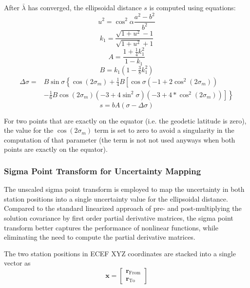 After $\bar{\lambda}$ has converged, the ellipsoidal distance $s$ is computed using equations:
\begin{equation}
u^2 = \cos^2 \alpha \frac{a^2 - b^2}{b^2}
\end{equation}
\begin{equation}
k_1 = \frac{\sqrt{1 + u^2} - 1}{\sqrt{1 + u^2} + 1} 
\end{equation}
\begin{equation}
A = \frac{1 + \tfrac{1}{4} k_1^2}{1-k_1}
\end{equation}
\begin{equation}
 B = k_1 \left(1 - \tfrac{3}{8} k_1^2 \right)
\end{equation}
\begin{equation}
\begin{split}
\Delta\sigma =& B \sin\sigma \left\lbrace \cos(2 \sigma_m) + \tfrac{1}{4} B \left[ \cos\sigma \left(-1 + 2 \cos^2(2\sigma_m) \right) \right. \right. \\
& \left. \left. - \tfrac{1}{6} B \cos(2\sigma_m) (-3 + 4 \sin^2\sigma) (-3 + 4 * \cos^2(2\sigma_m)) \right] \right\rbrace
\end{split}
\end{equation}
\begin{equation}
s = b A (\sigma - \Delta\sigma)
\end{equation}

For two points that are exactly on the equator (i.e. the geodetic latitude is zero), the value for the $\cos(2 \sigma_m)$ term is set to zero to avoid a singularity in the computation of that parameter (the term is not not used anyways when both points are exactly on the equator).  

\subsubsection{Sigma Point Transform for Uncertainty Mapping}

The unscaled sigma point transform \cite{julier1995new} is employed to map the uncertainty in both station positions into a single uncertainty value for the ellipsoidal distance. Compared to the standard linearized approach of pre- and post-multiplying the solution covariance by first order partial derivative matrices, the sigma point transform better captures the performance of nonlinear functions, while eliminating the need to compute the partial derivative matrices.

The two station positions in ECEF XYZ coordinates are stacked into a single vector as
\begin{equation}
\boldsymbol{x} = \left[ \begin{array}{c} 
\boldsymbol{r}_{\text{From}} \\ \boldsymbol{r}_{\text{To}}
\end{array} \right]
\end{equation}

